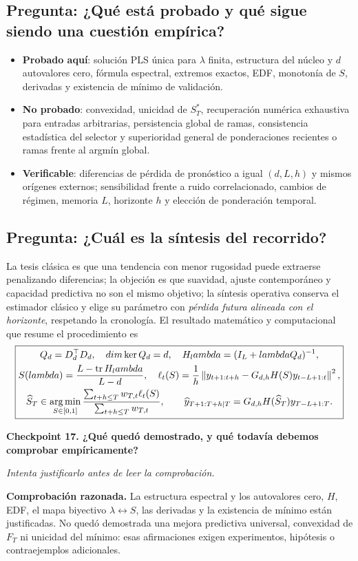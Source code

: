 \documentclass[11pt,letterpaper,parskip=half,headings=small]{scrartcl}
\theoremstyle{definition}\newtheorem{definicion}[proposicion]{Definición}
\theoremstyle{remark}\newtheorem{observacion}[proposicion]{Observación}
\newcommand{\argmin}{\operatorname*{arg\,min}}\newcommand{\diag}{\operatorname{diag}}
\newcommand{\norm}[1]{\left\lVert#1\right\rVert}\newcommand{\inner}[2]{\left\langle#1,#2\right\rangle}
\newcommand{\pregunta}[1]{\subsection{Pregunta: #1}}
\newcommand{\checkpoint}[3]{%
  \par\medskip\noindent\textbf{\color{blue!45!black}Checkpoint #1. #2}\par
  \noindent\emph{Intenta justificarlo antes de leer la comprobación.}\par
  \noindent\textbf{Comprobación razonada. }#3\par\bigskip
}
\begin{document}
\pregunta{¿Qué está probado y qué sigue siendo una cuestión empírica?}
\begin{itemize}
\item \textbf{Probado aquí}: solución PLS única para $\lambda$ finita, estructura del núcleo y $d$ autovalores cero, fórmula espectral, extremos exactos, EDF, monotonía de $S$, derivadas y existencia de mínimo de validación.
\item \textbf{No probado}: convexidad, unicidad de $S_T^*$, recuperación numérica exhaustiva para entradas arbitrarias, persistencia global de ramas, consistencia estadística del selector y superioridad general de ponderaciones recientes o ramas frente al argmín global.
\item \textbf{Verificable}: diferencias de pérdida de pronóstico a igual $(d,L,h)$ y mismos orígenes externos; sensibilidad frente a ruido correlacionado, cambios de régimen, memoria $L$, horizonte $h$ y elección de ponderación temporal.
\end{itemize}

\pregunta{¿Cuál es la síntesis del recorrido?}
La tesis clásica es que una tendencia con menor rugosidad puede extraerse penalizando diferencias; la objeción es que suavidad, ajuste contemporáneo y capacidad predictiva no son el mismo objetivo; la síntesis operativa conserva el estimador clásico y elige su parámetro con \emph{pérdida futura alineada con el horizonte}, respetando la cronología. El resultado matemático y computacional que resume el procedimiento es
\begin{equation}\label{eq:recap}
\boxed{\begin{gathered}
Q_d=D_d^\top D_d,\quad \dim\nul Q_d=d,\quad
H_\lambda=(I_L+\lambda Q_d)^{-1},\\
S(\lambda)=\frac{L-\tr H_\lambda}{L-d},\quad
\ell_t(S)=\frac1h\norm{y_{t+1:t+h}-G_{d,h}H(S)y_{t-L+1:t}}^2,\\
\widehat S_T\in\argmin_{S\in[0,1]}
\frac{\sum_{t+h\leq T}w_{T,t}\ell_t(S)}{\sum_{t+h\leq T}w_{T,t}},\qquad
\widehat y_{T+1:T+h\mid T}=G_{d,h}H(\widehat S_T)y_{T-L+1:T}.
\end{gathered}}
\end{equation}

\checkpoint{17}{¿Qué quedó demostrado, y qué todavía debemos comprobar empíricamente?}{La estructura espectral y los autovalores cero, $H$, EDF, el mapa biyectivo $\lambda\leftrightarrow S$, las derivadas y la existencia de mínimo están justificadas. No quedó demostrada una mejora predictiva universal, convexidad de $F_T$ ni unicidad del mínimo: esas afirmaciones exigen experimentos, hipótesis o contraejemplos adicionales.}
\end{document}
